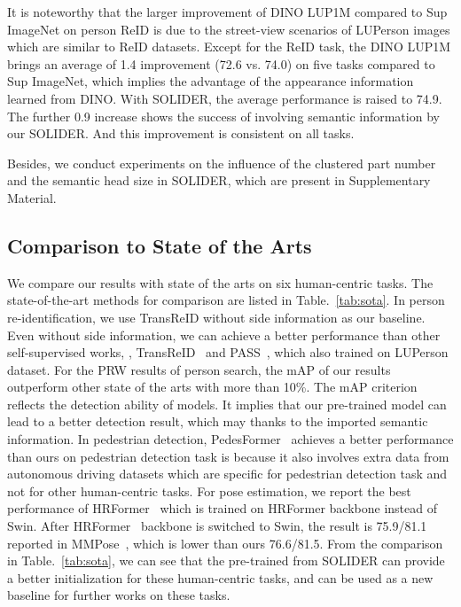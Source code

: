 \documentclass[10pt,twocolumn,letterpaper]{article}
\begin{document}
It is noteworthy that the larger improvement of DINO LUP1M compared to Sup ImageNet on person ReID is due to the street-view scenarios of LUPerson images which are similar to ReID datasets. Except for the ReID task, the DINO LUP1M brings an average of 1.4 improvement (72.6 vs. 74.0) on five tasks compared to Sup ImageNet, which implies the advantage of the appearance information learned from DINO. With SOLIDER, the average performance is raised to 74.9. The further 0.9 increase shows the success of involving semantic information by our SOLIDER. And this improvement is consistent on all tasks.

Besides, we conduct experiments on the influence of the clustered part number and the semantic head size in SOLIDER, which are present in Supplementary Material. 

\subsection{Comparison to State of the Arts}

We compare our results with state of the arts on six human-centric tasks. The state-of-the-art methods for comparison are listed in Table.~\ref{tab:sota}. 
In person re-identification, we use TransReID without side information as our baseline. Even without side information, we can achieve a better performance than other self-supervised works, \eg, TransReID~\cite{transreid} and PASS~\cite{pass}, which also trained on LUPerson dataset.
For the PRW results of person search, the mAP of our results  outperform other state of the arts with more than 10\%. The mAP criterion reflects the detection ability of models. It implies that our pre-trained model can lead to a better detection result, which may thanks to the imported semantic information.
In pedestrian detection, PedesFormer~\cite{pedesformer} achieves a better performance than ours on pedestrian detection task is because it also involves extra data from autonomous driving datasets which are specific for pedestrian detection task and not for other human-centric tasks. 
For pose estimation, we report the best performance of HRFormer~\cite{hrformer} which is trained on HRFormer backbone instead of Swin. 
After HRFormer~\cite{hrformer} backbone is switched to Swin, the result is 75.9/81.1 reported in MMPose~\cite{mmpose2020}, which is lower than ours 76.6/81.5.
From the comparison in Table.~\ref{tab:sota}, we can see that the pre-trained from SOLIDER can provide a better initialization for these human-centric tasks, and can be used as a new baseline for further works on these tasks. 
\end{document}
